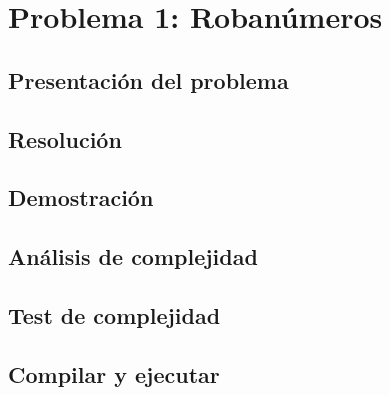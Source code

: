 \section{Problema 1: Roban\'umeros}

\subsection{Presentaci\'on del problema}

\subsection{Resoluci\'on}

\subsection{Demostraci\'on}

\subsection{An\'alisis de complejidad}

\subsection{Test de complejidad}

\subsection{Compilar y ejecutar}
